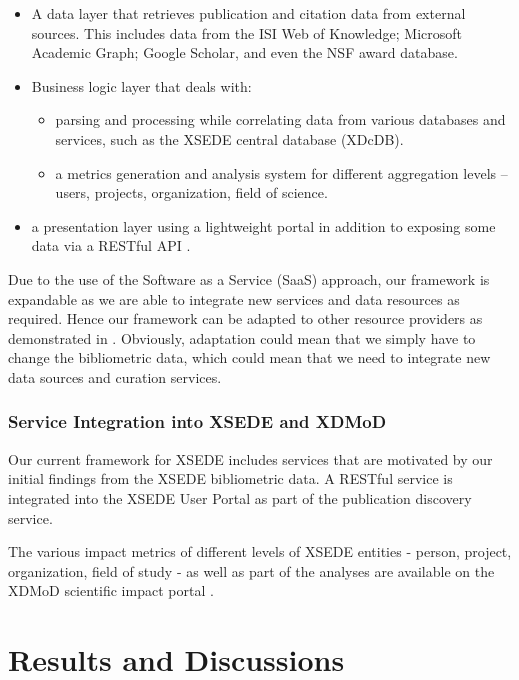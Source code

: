 \documentclass{sig-alternate}
\begin{document}
\begin{itemize}
\item A data layer that retrieves publication and citation data from external sources.
This includes data from the ISI Web of Knowledge;
Microsoft Academic Graph; Google Scholar, and even the NSF award database.
\item Business logic layer that deals with:
\begin{itemize}
\item parsing and processing while correlating data from various databases
and services, such as the XSEDE central database (XDcDB).
\item a metrics generation and analysis system for different aggregation
levels -- users, projects, organization, field of science.
\end{itemize}
\item a presentation layer using a lightweight portal in addition to exposing
some data via a RESTful API \cite{Wang:2014:TSI:2616498.2616507}.
\end{itemize}

Due to the use of the Software as a Service (SaaS) approach, our framework is
expandable as we are able to integrate new services and data resources
as required. Hence our framework can be adapted to other resource providers
as demonstrated in \cite{tas2015}. Obviously, adaptation could mean
that we simply have to change the bibliometric data, which could mean that
we need to integrate new data sources and curation services.

\subsubsection{Service Integration into XSEDE and XDMoD}

Our current framework for XSEDE includes services that are motivated by our
initial findings from the XSEDE bibliometric data. A RESTful service is integrated
into the XSEDE User Portal as part of the publication discovery service.

The various impact metrics of different levels of XSEDE entities - person, project,
organization, field of study - as well as part of the analyses are available on
the XDMoD scientific impact portal \cite{www-xdmod-sciimp}.

\section{Results and Discussions} \label{S:result}
\end{document}
